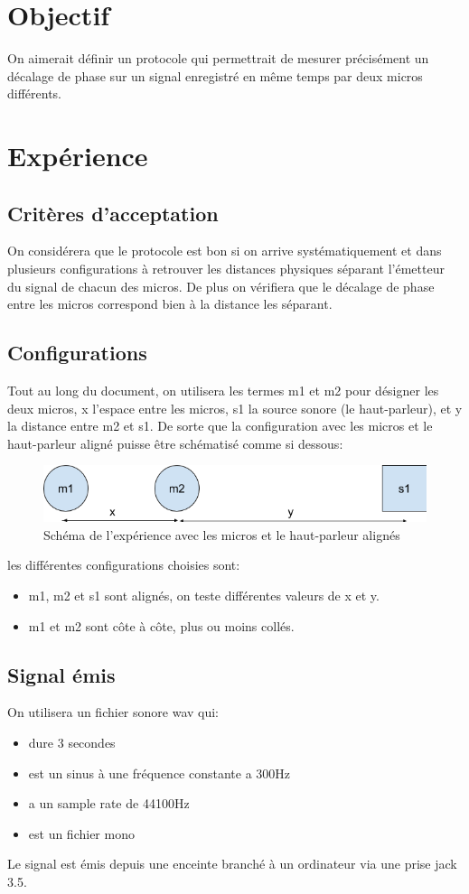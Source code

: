 \documentclass[12pt,a4paper]{report}
\begin{document}
\section{Objectif}
On aimerait définir un protocole qui permettrait de mesurer précisément un décalage de phase sur un signal enregistré en même temps par deux micros différents.


\section{Expérience}
\subsection{Critères d'acceptation}
On considérera que le protocole est bon si on arrive systématiquement et dans plusieurs configurations à retrouver les distances physiques séparant l'émetteur du signal de chacun des micros. De plus on vérifiera que le décalage de phase entre les micros correspond bien à la distance les séparant.

\subsection{Configurations}
Tout au long du document, on utilisera les termes m1 et m2 pour désigner les deux micros, x l'espace entre les micros, s1 la source sonore (le haut-parleur), et y la distance entre m2 et s1. De sorte que la configuration avec les micros et le haut-parleur aligné puisse être schématisé comme si dessous:
\begin{figure}[H]
\includegraphics[width=\textwidth]{../tests/test_du_protocole/schema.png} 
\caption{Schéma de l'expérience avec les micros et le haut-parleur alignés}
\end{figure}
les différentes configurations choisies sont:
\begin{itemize}
\item m1, m2 et s1 sont alignés, on teste différentes valeurs de x et y.
\item m1 et m2 sont côte à côte, plus ou moins collés.
\end{itemize}
\subsection{Signal émis}
On utilisera un fichier sonore wav qui:
\begin{itemize}
\item dure 3 secondes
\item est un sinus à une fréquence constante a 300Hz
\item a un sample rate de 44100Hz
\item est un fichier mono
\end{itemize}
Le signal est émis depuis une enceinte branché à un ordinateur via une prise jack 3.5.
\end{document}
